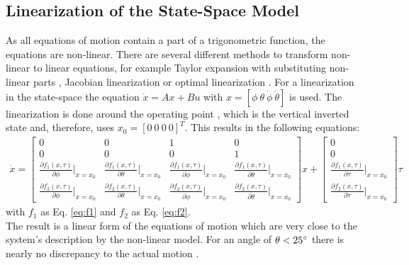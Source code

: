 \subsection{Linearization of the State-Space Model}
As all equations of motion contain a part of a trigonometric function, the 
equations are non-linear. There are several different methods to transform 
non-linear to linear equations, for example Taylor expansion with 
substituting non-linear parts \citep{hamza2015genetic}, Jacobian 
linearization \citep{al2013experimental} or optimal linearization 
\citep{zhang2011optimal}.
 For a linearization in the state-space the equation 
$\dot{x}=Ax+Bu$ with $x=[\phi\ \theta\ \dot{\phi}\ \dot{\theta}]$ is used. The 
linearization is done around the 
operating point \citep{furuta1992swing}, which is the vertical inverted 
state and, therefore, uses $x_0=[0 \ 0\ 0\ 0]^T$. This results in 
the following equations: 
\begin{align}
\dot{x}=
\begin{bmatrix}
0	& 0 &1  &0  \\ 
0	&  0& 0 &  1\\ 
\frac{\partial f_1(x,\tau)}{\partial \phi}\Big|_{x=x_0}	& \frac{\partial 
f_1(x,\tau)}{\partial \theta}\Big|_{x=x_0} & \frac{\partial 
f_1(x,\tau)}{\partial 
\dot{\phi}}\Big|_{x=x_0} & \frac{\partial f_1(x,\tau)}{\partial 
\dot{\theta}}\Big|_{x=x_0} \\ 
\frac{\partial f_2(x,\tau)}{\partial \phi}\Big|_{x=x_0}	& \frac{\partial 
	f_2(x,\tau)}{\partial \theta}\Big|_{x=x_0} & \frac{\partial 
	f_2(x,\tau)}{\partial 
	\dot{\phi}}\Big|_{x=x_0} & \frac{\partial f_2(x,\tau)}{\partial 
	\dot{\theta}}\Big|_{x=x_0} 
\end{bmatrix} 
x +
\begin{bmatrix}
0	\\ 
0	\\ 
\frac{\partial f_1(x,\tau)}{\partial 
	\tau}\Big|_{x=x_0} 	\\
\frac{\partial f_2(x,\tau)}{\partial 
	\tau}\Big|_{x=x_0} 
\end{bmatrix} \tau
\label{eq:liner}
\end{align} with $f_1$ as Eq. \eqref{eq:f1} and $f_2$ as Eq. \eqref{eq:f2}.\\
The result is a linear form of the equations of motion which are very close to 
the system's description by the non-linear model. For an angle of 
$\theta<25\degree$  
there is nearly no discrepancy to the actual motion \citep{kurode2011swing}.

